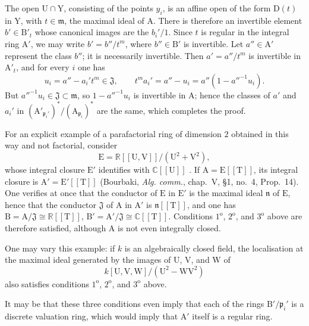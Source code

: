 \begin{env}[21.13.9]
The open $\mathrm{U}\cap\mathrm{Y}$, consisting of the points $y_i$, is an affine open of the form $\mathrm{D}(t)$ in $\mathrm{Y}$, with $t\in\mathfrak{m}$, the maximal ideal of $\mathrm{A}$. There is therefore an invertible element $b'\in\mathrm{B}'_t$ whose canonical images are the $b_i'/1$. Since $t$ is regular in the integral ring $\mathrm{A}'$, we may write $b'=b''/t^m$, where $b''\in\mathrm{B}'$ is invertible. Let $a''\in\mathrm{A}'$ represent the class $b''$; it is necessarily invertible. Then $a'=a''/t^m$ is invertible in $\mathrm{A}'_t$, and for every $i$ one has
\[
  u_i=a''-a_i't^m\in\mathfrak{J},
  \qquad
  t^m a_i'=a''-u_i=a''(1-a''^{-1}u_i).
\]
But $a''^{-1}u_i\in\mathfrak{J}\subset\mathfrak{m}$, so $1-a''^{-1}u_i$ is invertible in $\mathrm{A}$; hence the classes of $a'$ and $a_i'$ in $(\mathrm{A}'_{\mathfrak{p}_i'})^*/(\mathrm{A}_{\mathfrak{p}_i})^*$ are the same, which completes the proof.

For an explicit example of a parafactorial ring of dimension $2$ obtained in this way and not factorial, consider
\[
  \mathrm{E}=\mathbb{R}[[\mathrm{U},\mathrm{V}]]/(\mathrm{U}^2+\mathrm{V}^2),
\]
whose integral closure $\mathrm{E}'$ identifies with $\mathbb{C}[[\mathrm{U}]]$ . If $\mathrm{A}=\mathrm{E}[[\mathrm{T}]]$, its integral closure is $\mathrm{A}'=\mathrm{E}'[[\mathrm{T}]]$ (Bourbaki, \emph{Alg. comm.}, chap.~V, \S1, no.~4, Prop.~14). One verifies at once that the conductor of $\mathrm{E}$ in $\mathrm{E}'$ is the maximal ideal $\mathfrak{n}$ of $\mathrm{E}$, hence that the conductor $\mathfrak{J}$ of $\mathrm{A}$ in $\mathrm{A}'$ is $\mathfrak{n}[[\mathrm{T}]]$, and one has $\mathrm{B}=\mathrm{A}/\mathfrak{J}\cong\mathbb{R}[[\mathrm{T}]]$, $\mathrm{B}'=\mathrm{A}'/\mathfrak{J}\cong\mathbb{C}[[\mathrm{T}]]$. Conditions $1^{\mathrm{o}}$, $2^{\mathrm{o}}$, and $3^{\mathrm{o}}$ above are therefore satisfied, although $\mathrm{A}$ is not even integrally closed.

One may vary this example: if $k$ is an algebraically closed field, the localisation at the maximal ideal generated by the images of $\mathrm{U}$, $\mathrm{V}$, and $\mathrm{W}$ of
\[
  k[\mathrm{U},\mathrm{V},\mathrm{W}]/(\mathrm{U}^2-\mathrm{W}\mathrm{V}^2)
\]
also satisfies conditions $1^{\mathrm{o}}$, $2^{\mathrm{o}}$, and $3^{\mathrm{o}}$ above.

It may be that these three conditions even imply that each of the rings $\mathrm{B}'/\mathfrak{p}_i'$ is a discrete valuation ring, which would imply that $\mathrm{A}'$ itself is a regular ring.
\end{env}

